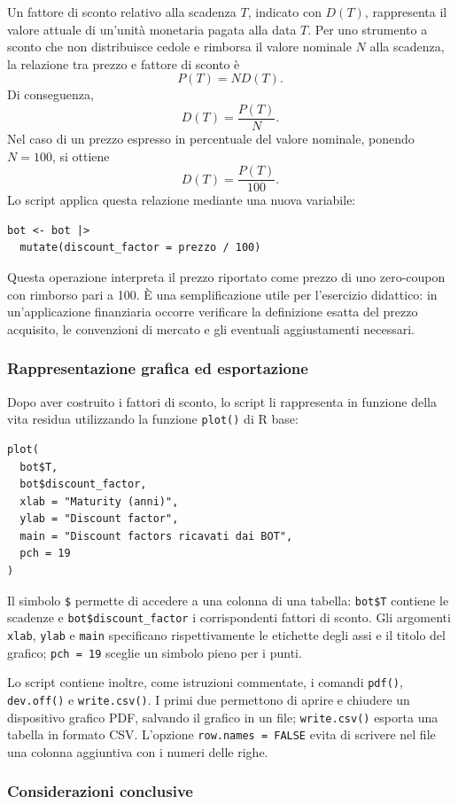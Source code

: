 Un fattore di sconto relativo alla scadenza $T$, indicato con $D(T)$, rappresenta il valore attuale di un'unità monetaria pagata alla data $T$. Per uno strumento a sconto che non distribuisce cedole e rimborsa il valore nominale $N$ alla scadenza, la relazione tra prezzo e fattore di sconto è
$$
P(T)=N D(T).
$$
Di conseguenza,
$$
D(T)=\frac{P(T)}{N}.
$$
Nel caso di un prezzo espresso in percentuale del valore nominale, ponendo $N=100$, si ottiene
$$
D(T)=\frac{P(T)}{100}.
$$
Lo script applica questa relazione mediante una nuova variabile:
\begin{verbatim}
bot <- bot |>
  mutate(discount_factor = prezzo / 100)
\end{verbatim}
Questa operazione interpreta il prezzo riportato come prezzo di uno zero-coupon con rimborso pari a 100. È una semplificazione utile per l'esercizio didattico: in un'applicazione finanziaria occorre verificare la definizione esatta del prezzo acquisito, le convenzioni di mercato e gli eventuali aggiustamenti necessari.

\subsubsection{Rappresentazione grafica ed esportazione}

Dopo aver costruito i fattori di sconto, lo script li rappresenta in funzione della vita residua utilizzando la funzione \texttt{plot()} di R base:
\begin{verbatim}
plot(
  bot$T,
  bot$discount_factor,
  xlab = "Maturity (anni)",
  ylab = "Discount factor",
  main = "Discount factors ricavati dai BOT",
  pch = 19
)
\end{verbatim}
Il simbolo \texttt{\$} permette di accedere a una colonna di una tabella: \texttt{bot\$T} contiene le scadenze e \texttt{bot\$discount\_factor} i corrispondenti fattori di sconto. Gli argomenti \texttt{xlab}, \texttt{ylab} e \texttt{main} specificano rispettivamente le etichette degli assi e il titolo del grafico; \texttt{pch = 19} sceglie un simbolo pieno per i punti.

Lo script contiene inoltre, come istruzioni commentate, i comandi \texttt{pdf()}, \texttt{dev.off()} e \texttt{write.csv()}. I primi due permettono di aprire e chiudere un dispositivo grafico PDF, salvando il grafico in un file; \texttt{write.csv()} esporta una tabella in formato CSV. L'opzione \texttt{row.names = FALSE} evita di scrivere nel file una colonna aggiuntiva con i numeri delle righe.

\subsubsection{Considerazioni conclusive}

